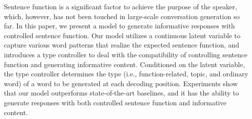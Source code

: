 Sentence function is a significant factor to achieve the purpose of the speaker, which, however, has not been touched in large-scale conversation generation so far. In this paper, we present a model to generate informative responses with controlled sentence function. Our model utilizes a continuous latent variable to capture various word patterns that realize the expected sentence function, and introduces a type controller to deal with the compatibility of controlling sentence function and generating informative content. Conditioned on the latent variable, the type controller determines the type (i.e., function-related, topic, and ordinary word) of a word to be generated at each decoding position. Experiments show that our model outperforms state-of-the-art baselines, and it has the ability to generate responses with both controlled sentence function and informative content.
